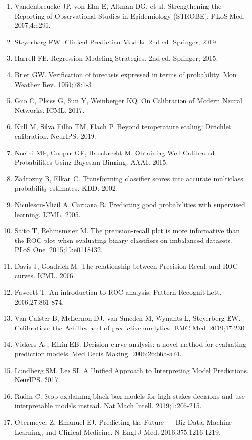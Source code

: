 \documentclass[11pt]{article}
\begin{document}
\begin{enumerate}
\item Vandenbroucke JP, von Elm E, Altman DG, et al. Strengthening the Reporting of Observational Studies in Epidemiology (STROBE). PLoS Med. 2007;4:e296.
\item Steyerberg EW. Clinical Prediction Models. 2nd ed. Springer; 2019.
\item Harrell FE. Regression Modeling Strategies. 2nd ed. Springer; 2015.
\item Brier GW. Verification of forecasts expressed in terms of probability. Mon Weather Rev. 1950;78:1-3.
\item Guo C, Pleiss G, Sun Y, Weinberger KQ. On Calibration of Modern Neural Networks. ICML. 2017.
\item Kull M, Silva Filho TM, Flach P. Beyond temperature scaling: Dirichlet calibration. NeurIPS. 2019.
\item Naeini MP, Cooper GF, Hauskrecht M. Obtaining Well Calibrated Probabilities Using Bayesian Binning. AAAI. 2015.
\item Zadrozny B, Elkan C. Transforming classifier scores into accurate multiclass probability estimates. KDD. 2002.
\item Niculescu-Mizil A, Caruana R. Predicting good probabilities with supervised learning. ICML. 2005.
\item Saito T, Rehmsmeier M. The precision-recall plot is more informative than the ROC plot when evaluating binary classifiers on imbalanced datasets. PLoS One. 2015;10:e0118432.
\item Davis J, Goadrich M. The relationship between Precision-Recall and ROC curves. ICML. 2006.
\item Fawcett T. An introduction to ROC analysis. Pattern Recognit Lett. 2006;27:861-874.
\item Van Calster B, McLernon DJ, van Smeden M, Wynants L, Steyerberg EW. Calibration: the Achilles heel of predictive analytics. BMC Med. 2019;17:230.
\item Vickers AJ, Elkin EB. Decision curve analysis: a novel method for evaluating prediction models. Med Decis Making. 2006;26:565-574.
\item Lundberg SM, Lee SI. A Unified Approach to Interpreting Model Predictions. NeurIPS. 2017.
\item Rudin C. Stop explaining black box models for high stakes decisions and use interpretable models instead. Nat Mach Intell. 2019;1:206-215.
\item Obermeyer Z, Emanuel EJ. Predicting the Future — Big Data, Machine Learning, and Clinical Medicine. N Engl J Med. 2016;375:1216-1219.

\end{enumerate}
\end{document}

